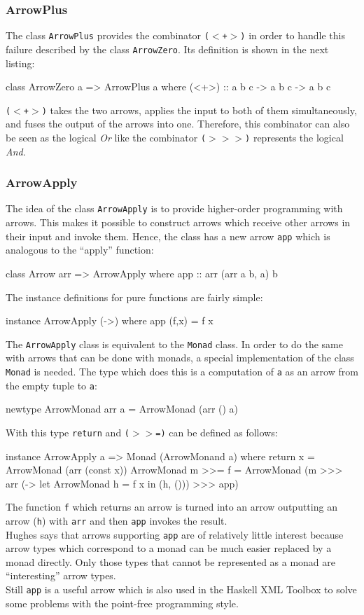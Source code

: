 \documentclass[11pt,a4paper,headsepline, bibtotoc]{scrreprt}
\begin{document}
\subsubsection{ArrowPlus}
The class \texttt{ArrowPlus} provides the combinator \texttt{($<$+$>$)} in order to handle this failure described by the class \texttt{ArrowZero}. Its definition is shown in the next listing:
\begin{code}
class ArrowZero a => ArrowPlus a where
  (<+>) :: a b c -> a b c -> a b c
\end{code} 
\texttt{($<$+$>$)} takes the two arrows, applies the input to both of them simultaneously, and fuses the output of the arrows into one. Therefore, this combinator can also be seen as the logical \textit{Or} like the combinator {\tt ($>$$>$$>$)} represents the logical \textit{And}.

\subsubsection{ArrowApply}
The idea of the class \texttt{ArrowApply} is to provide higher-order programming with arrows. This makes it possible to construct arrows which receive other arrows in their input and invoke them. Hence, the class has a new arrow \texttt{app} which is analogous to the ``apply'' function:
\begin{code}
class Arrow arr => ArrowApply where
  app :: arr (arr a b, a) b
\end{code}
The instance definitions for pure functions are fairly simple:
\begin{code}
instance ArrowApply (->) where
  app (f,x) = f x
\end{code}
The \texttt{ArrowApply} class is equivalent to the \texttt{Monad} class. In order to do the same with arrows that can be done with monads, a special implementation of the class \texttt{Monad} is needed. The type which does this is a computation of \texttt{a} as an arrow from the empty tuple to \texttt{a}:
\begin{code}
newtype ArrowMonad arr a = ArrowMonad (arr () a)
\end{code}
With this type \texttt{return} and \texttt{($>$$>$=)} can be defined as follows:
\begin{code}
instance ArrowApply a => Monad (ArrowMonand a) where
  return x = ArrowMonad (arr (const x))
  ArrowMonad m >>= f =
    ArrowMonad (m >>>
                arr (\x -> let ArrowMonad h = f x in (h, ()))
                >>> app) 
\end{code}
The function \texttt{f} which returns an arrow is turned into an arrow outputting an arrow (\texttt{h}) with \texttt{arr} and then \texttt{app} invokes the result.\\
Hughes says that arrows supporting \texttt{app} are of relatively little interest because arrow types which correspond to a monad can be much easier replaced by a monad directly. Only those types that cannot be represented as a monad are ``interesting'' arrow types.\\
Still \texttt{app} is a useful arrow which is also used in the Haskell XML Toolbox to solve some problems with the point-free programming style.
\end{document}

